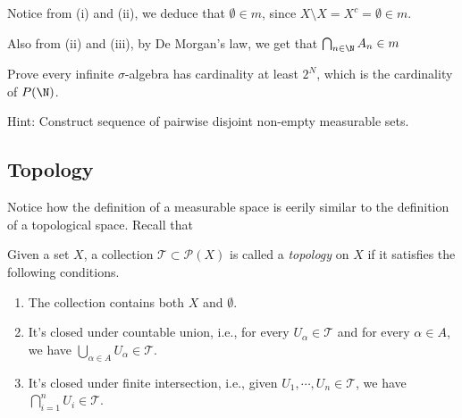 \begin{note}
  Notice from (i) and (ii), we deduce that $\emptyset \in m$, since $X \setminus X = X^c = \emptyset \in m$.

  Also from (ii) and (iii), by De Morgan's law, we get that $\bigcap_{n\in\N} A_n \in m$
\end{note}

\begin{exercise}
  Prove every infinite $\sigma$-algebra has cardinality at least $2^N$, which is the cardinality of $P(\N)$.

  Hint: Construct sequence of pairwise disjoint non-empty measurable sets.
\end{exercise}

\begin{solution}
\end{solution}

\subsection{Topology}

Notice how the definition of a measurable space is eerily similar to the definition of a topological space. Recall that

\begin{definition}
  Given a set $X$, a collection $\mathcal{T} \subset \mathcal{P}(X)$ is called a \emph{topology} on $X$ if it satisfies the following conditions.
  \begin{enumerate}
    \item The collection contains both $X$ and $\emptyset$.
    \item It's closed under countable union, i.e., for every $U_\alpha \in \mathcal{T}$ and for every $\alpha \in A$, we have $\bigcup_{\alpha\in A} U_\alpha \in \mathcal{T}$.
    \item It's closed under finite intersection, i.e., given $U_1, \cdots, U_n \in \mathcal{T}$, we have $\bigcap_{i=1}^n U_i \in \mathcal{T}$.
  \end{enumerate}
\end{definition}
